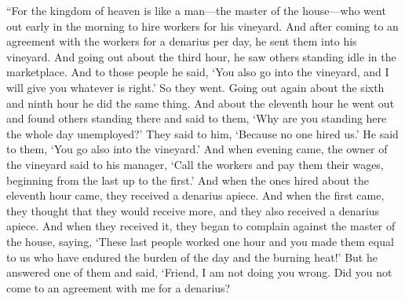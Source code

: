 \begin{biblechapter} %
 “For the kingdom of heaven is like a man—the master of the house—who went out early in the morning to hire workers for his vineyard.
\verse And after coming to an agreement with the workers for a denarius per day, he sent them into his vineyard.
\verse And going out about the third hour, he saw others standing idle in the marketplace.
\verse And to those people he said, ‘You also go into the vineyard, and I will give you whatever is right.’
\verse So they went. Going out again about the sixth and ninth hour he did the same thing.
\verse And about the eleventh hour he went out and found others standing there and said to them, ‘Why are you standing here the whole day unemployed?’
\verse They said to him, ‘Because no one hired us.’ He said to them, ‘You go also into the vineyard.’
\verse And when evening came, the owner of the vineyard said to his manager, ‘Call the workers and pay them their wages, beginning from the last up to the first.’
\verse And when the ones hired about the eleventh hour came, they received a denarius apiece.
\verse And when the first came, they thought that they would receive more, and they also received a denarius apiece.
\verse And when they received it, they began to complain against the master of the house,
\verse saying, ‘These last people worked one hour and you made them equal to us who have endured the burden of the day and the burning heat!’
\verse But he answered one of them and said, ‘Friend, I am not doing you wrong. Did you not come to an agreement with me for a denarius?

\end{biblechapter}
